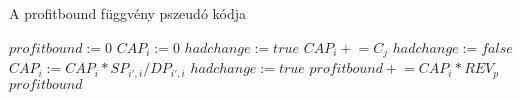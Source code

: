 \begin{algorithm}[H]
\caption{A profitbound függvény pszeudó kódja}
\label{profitbound}
\begin{algorithmic}[1]
	\State $profitbound:= 0$
	\State $CAP_{i}:= 0$
	\State $hadchange:= true$
			\State $CAP_{i} \mathrel{+}= C_{j}$			
		\EndFor
	\EndFor
		\State $hadchange:= false$
					\State $CAP_{i}:= CAP_{i}*SP_{i',i}/DP_{i',i}$
					\State $hadchange:= true$
				\EndIf
			\EndFor	
		\EndFor
	\EndWhile
				\State $profitbound \mathrel{+}= CAP_{i}*REV_{p}$
			\EndIf
		\EndFor
	\EndFor
	\State \Return $profitbound$
\EndProcedure
\end{algorithmic}
\end{algorithm}